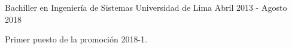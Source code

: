 

\begin{cventries}

  \cventry
    {Bachiller en Ingeniería de Sistemas} %
    {Universidad de Lima} %
    {} %
    {Abril 2013 - Agosto 2018} %
    {
      \begin{cvitems} %
        \item {Primer puesto de la promoción 2018-1.}
      \end{cvitems}
    }

\end{cventries}
